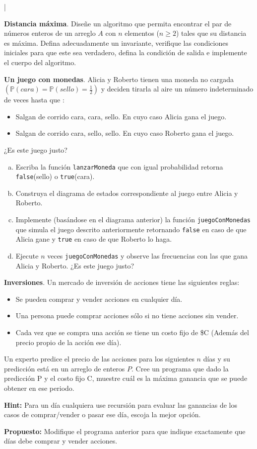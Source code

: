 |\documentclass[dcc]{fcfmcourse}
\begin{document}
\begin{problems}


\problem \textbf{Distancia máxima}. Diseñe un algoritmo que permita encontrar el par de números enteros de un arreglo $A$ con $n$ elementos ($n\geq2$) tales que su distancia es máxima. Defina adecuadamente un invariante, verifique las condiciones iniciales para que este sea verdadero, defina la condición de salida e implemente el cuerpo del algoritmo.
\newpage

\problem \textbf{Un juego con monedas}. Alicia y Roberto tienen una moneda no cargada $\left(\mathbb{P}(cara) = \mathbb{P}(sello) = \frac{1}{2}\right)$ y deciden tirarla al aire un número indeterminado de veces hasta que :
\begin{itemize}
    \item Salgan de corrido cara, cara, sello. En cuyo caso Alicia gana el juego.
    \item Salgan de corrido cara, sello, sello. En cuyo caso Roberto gana el juego.
\end{itemize}
¿Es este juego justo?
\begin{enumerate}[a)]
    \item Escriba la función \texttt{lanzarMoneda} que con igual probabilidad retorna \texttt{false}(sello) o \texttt{true}(cara).
    \item Construya el diagrama de estados correspondiente al juego entre Alicia y Roberto.
    \item Implemente (basándose en el diagrama anterior) la función \texttt{juegoConMonedas} que simula el juego descrito anteriormente retornando \texttt{false} en caso de que Alicia gane y \texttt{true} en caso de que Roberto lo haga.
    \item Ejecute $n$ veces \texttt{juegoConMonedas} y observe las frecuencias con las que gana Alicia y Roberto. ¿Es este juego justo?
\end{enumerate}
\vspace{5ex}
\problem \textbf{Inversiones}. Un mercado de inversión de acciones tiene las siguientes reglas: 
\begin{itemize}
    \item Se pueden comprar y vender acciones en cualquier día.
    \item Una persona puede comprar acciones sólo si no tiene acciones sin vender.
    \item Cada vez que se compra una acción se tiene un costo fijo de \$C (Además del precio propio de la acción ese día).
\end{itemize}  
Un experto predice el precio de las acciones para los siguientes $n$ días y su predicción está en un arreglo de enteros $P$. Cree un programa que dado la predicción P y el costo fijo C, muestre cuál es la máxima ganancia que se puede obtener en ese periodo.

\textbf{Hint:} Para un día cualquiera use recursión para evaluar las ganancias de los casos de comprar/vender o pasar ese día, escoja la mejor opción.

\textbf{Propuesto:} Modifique el programa anterior para que indique exactamente que días debe comprar y vender acciones.
\end{problems}
\end{document}
